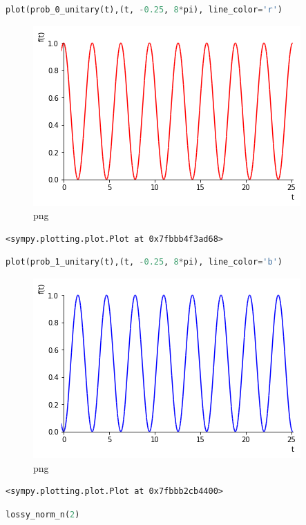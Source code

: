 \begin{lstlisting}[language=Python]
plot(prob_0_unitary(t),(t, -0.25, 8*pi), line_color='r')
\end{lstlisting}

\begin{figure}
\centering
\includegraphics[width=0.66\linewidth]{output_40_0.png}
\caption{png}
\end{figure}

\begin{lstlisting}
<sympy.plotting.plot.Plot at 0x7fbbb4f3ad68>
\end{lstlisting}

\begin{lstlisting}[language=Python]
plot(prob_1_unitary(t),(t, -0.25, 8*pi), line_color='b')
\end{lstlisting}

\begin{figure}
\centering
\includegraphics[width=0.66\linewidth]{output_41_0.png}
\caption{png}
\end{figure}

\begin{lstlisting}
<sympy.plotting.plot.Plot at 0x7fbbb2cb4400>
\end{lstlisting}

\begin{lstlisting}[language=Python]
lossy_norm_n(2)
\end{lstlisting}

